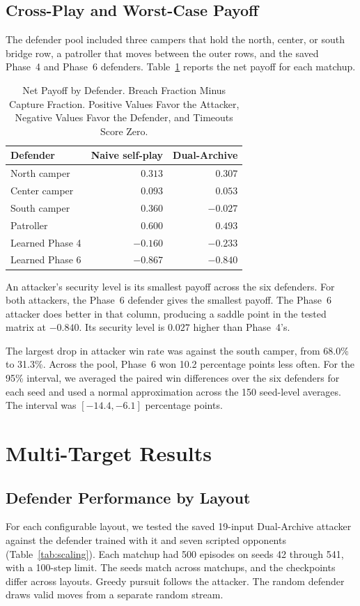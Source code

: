 \documentclass[conference,a4paper]{IEEEtran}
\begin{document}
\subsection{Cross-Play and Worst-Case Payoff}
The defender pool included three campers that hold the north, center, or south bridge row, a patroller that moves between the outer rows, and the saved Phase~4 and Phase~6 defenders. Table~\ref{tab:payoffs} reports the net payoff for each matchup.
\begin{table}[!t]
\caption{Net Payoff by Defender. Breach Fraction Minus Capture Fraction. Positive Values Favor the Attacker, Negative Values Favor the Defender, and Timeouts Score Zero.}
\label{tab:payoffs}
\centering
\begin{tabular}{@{}lrr@{}}
\toprule
Defender & Naive self-play & Dual-Archive \\
\midrule
North camper & $0.313$ & $0.307$ \\
Center camper & $0.093$ & $0.053$ \\
South camper & $0.360$ & $-0.027$ \\
Patroller & $0.600$ & $0.493$ \\
Learned Phase 4 & $-0.160$ & $-0.233$ \\
Learned Phase 6 & $-0.867$ & $-0.840$ \\
\bottomrule
\end{tabular}
\end{table}

An attacker's security level is its smallest payoff across the six defenders. For both attackers, the Phase~6 defender gives the smallest payoff. The Phase~6 attacker does better in that column, producing a saddle point in the tested matrix at $-0.840$. Its security level is $0.027$ higher than Phase~4's.

The largest drop in attacker win rate was against the south camper, from 68.0\% to 31.3\%. Across the pool, Phase~6 won 10.2 percentage points less often. For the 95\% interval, we averaged the paired win differences over the six defenders for each seed and used a normal approximation across the 150 seed-level averages. The interval was $[-14.4,-6.1]$ percentage points.

\section{Multi-Target Results}

\subsection{Defender Performance by Layout}
For each configurable layout, we tested the saved 19-input Dual-Archive attacker against the defender trained with it and seven scripted opponents (Table~\ref{tab:scaling}). Each matchup had 500 episodes on seeds 42 through 541, with a 100-step limit. The seeds match across matchups, and the checkpoints differ across layouts. Greedy pursuit follows the attacker. The random defender draws valid moves from a separate random stream.
\end{document}
